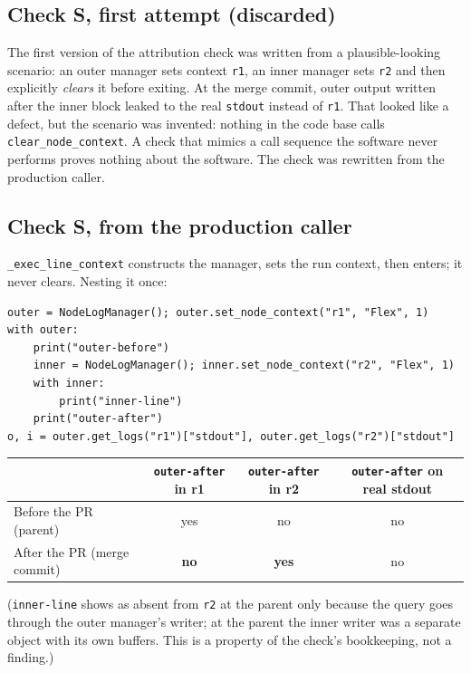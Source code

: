\documentclass[11pt,a4paper]{article}
\newcommand{\code}[1]{\texttt{#1}}
\begin{document}
\subsection{Check S, first attempt (discarded)}
The first version of the attribution check was written from a plausible-looking scenario: an outer manager sets context \code{r1}, an inner manager sets \code{r2} and then explicitly \emph{clears} it before exiting. At the merge commit, outer output written after the inner block leaked to the real \code{stdout} instead of \code{r1}. That looked like a defect, but the scenario was invented: nothing in the code base calls \code{clear\_node\_context}. A check that mimics a call sequence the software never performs proves nothing about the software. The check was rewritten from the production caller.

\subsection{Check S, from the production caller}
\code{\_exec\_line\_context} constructs the manager, sets the run context, then enters; it never clears. Nesting it once:
\begin{lstlisting}
outer = NodeLogManager(); outer.set_node_context("r1", "Flex", 1)
with outer:
    print("outer-before")
    inner = NodeLogManager(); inner.set_node_context("r2", "Flex", 1)
    with inner:
        print("inner-line")
    print("outer-after")
o, i = outer.get_logs("r1")["stdout"], outer.get_logs("r2")["stdout"]
\end{lstlisting}

\begin{center}\small
\begin{tabular}{l c c c}
\toprule
 & \code{outer-after} in r1 & \code{outer-after} in r2 & \code{outer-after} on real stdout \\
\midrule
Before the PR (parent) & yes & no & no \\
After the PR (merge commit) & \textbf{no} & \textbf{yes} & no \\
\bottomrule
\end{tabular}
\end{center}
(\code{inner-line} shows as absent from \code{r2} at the parent only because the query goes through the outer manager's writer; at the parent the inner writer was a separate object with its own buffers. This is a property of the check's bookkeeping, not a finding.)
\end{document}
